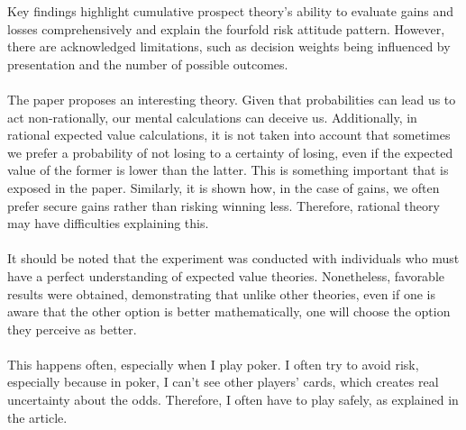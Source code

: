 \documentclass[11pt]{article}
\begin{document}
\begin{flushleft}
    Key findings highlight cumulative prospect theory's ability to evaluate gains and losses comprehensively and explain the fourfold risk attitude pattern. However, there are acknowledged limitations, such as decision weights being influenced by presentation and the number of possible outcomes.\\~\\
    
    The paper proposes an interesting theory. Given that probabilities can lead us to act non-rationally, our mental calculations can deceive us. Additionally, in rational expected value calculations, it is not taken into account that sometimes we prefer a probability of not losing to a certainty of losing, even if the expected value of the former is lower than the latter. This is something important that is exposed in the paper. Similarly, it is shown how, in the case of gains, we often prefer secure gains rather than risking winning less. Therefore, rational theory may have difficulties explaining this.\\~\\
    
    It should be noted that the experiment was conducted with individuals who must have a perfect understanding of expected value theories. Nonetheless, favorable results were obtained, demonstrating that unlike other theories, even if one is aware that the other option is better mathematically, one will choose the option they perceive as better.\\~\\
    
    This happens often, especially when I play poker. I often try to avoid risk, especially because in poker, I can't see other players' cards, which creates real uncertainty about the odds. Therefore, I often have to play safely, as explained in the article.
\end{flushleft}
\newpage
\medskip

\newpage
\end{document}
